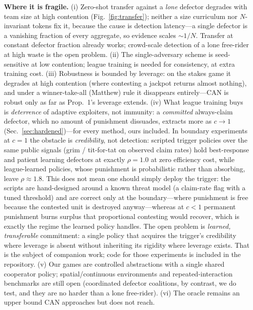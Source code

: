 \documentclass[conference, a4paper]{IEEEtran}
\begin{document}
\textbf{Where it is fragile.} (i) Zero-shot transfer against a \emph{lone}
defector degrades with team size at high contention (Fig.~\ref{fig:transfer});
neither a size curriculum nor $N$-invariant tokens fix it, because the cause is
detection latency---a single defector is a vanishing fraction of every aggregate,
so evidence scales ${\sim}1/N$. Transfer at constant defector fraction already
works; crowd-scale detection of a lone free-rider at high waste is the open
problem. (ii) The single-adversary
scheme
is seed-sensitive at low contention; league training is needed for consistency, at
extra training cost. (iii) Robustness is bounded by leverage: on the stakes game it
degrades at high contention (where contesting a jackpot returns almost nothing), and
under a winner-take-all (Matthew) rule it disappears entirely---CAN is robust only
as far as Prop.~1's leverage extends. (iv) What league training buys is
\emph{deterrence} of adaptive exploiters, not immunity: a \emph{committed}
always-claim defector, which no amount of punishment dissuades, extracts more as
$c\to1$ (Sec.~\ref{sec:hardened})---for every method, ours included. In
boundary experiments at $c{=}1$ the obstacle is \emph{credibility}, not
detection: scripted trigger policies over the same public signals (grim /
tit-for-tat on observed claim rates) hold best-response and patient learning
defectors at exactly $\rho{=}1.0$ at zero efficiency cost, while league-learned
policies, whose punishment is probabilistic rather than absorbing, leave
$\rho{\approx}1.8$. This does not mean one should simply deploy the trigger:
the scripts are hand-designed around a known threat model (a claim-rate flag
with a tuned threshold) and are correct only at the boundary---where
punishment is free because the contested unit is destroyed anyway---whereas at
$c<1$ permanent punishment burns surplus that proportional contesting would
recover, which is exactly the regime the learned policy handles. The open
problem is \emph{learned, transferable} commitment: a single policy that
acquires the trigger's credibility where leverage is absent without inheriting
its rigidity where leverage exists. That is the subject of companion work;
code for those experiments is included in the repository. (v) Our games
are controlled abstractions with
a single shared cooperator policy; spatial/continuous environments and
repeated-interaction benchmarks are still open
(coordinated defector coalitions, by contrast, we do test, and they are no harder
than a lone free-rider). (vi) The oracle remains an upper bound CAN approaches but
does not reach.
\end{document}
